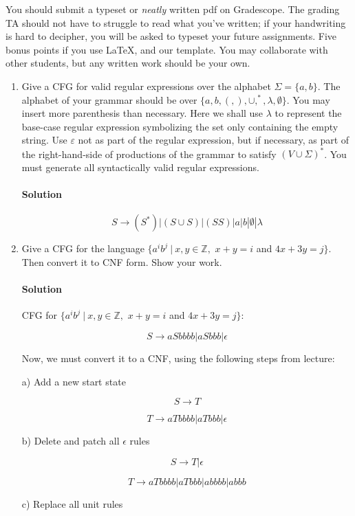 \documentclass[11pt]{article}
\newcommand{\solution}[1]{\paragraph{Solution}  }
\begin{document}

You should submit a typeset or \emph{neatly} written pdf on Gradescope.  The grading TA should not have to struggle to read what you've written; if your handwriting is hard to decipher, you will be asked to typeset your future assignments. Five bonus points if you use \LaTeX, and our template. You may collaborate with other students, but any written work should be your own.

\begin{enumerate}

    \item Give a CFG for valid regular expressions over the alphabet $\Sigma = \{a,b\}$. The alphabet of your grammar should be over $\{a,b,(,), \cup, ^*, \lambda, \emptyset\}$. You may insert more parenthesis than necessary. Here we shall use $\lambda$ to represent the base-case regular expression symbolizing the set only containing the empty string. Use $\varepsilon$ not as part of the regular expression, but if necessary, as part of the right-hand-side of productions of the grammar to satisfy $(V \cup \Sigma)^*$. You must generate all syntactically valid regular expressions.

    \solution{1} 

    $$ S \rightarrow (S^*) | (S \cup S) | (SS) | a | b | \emptyset | \lambda $$
    
    \item Give a CFG for the language $\{a^ib^j~|~x,y \in \mathbb{Z}, $ $x+y = i$ and $4x+3y = j\}$. Then convert it to CNF form. Show your work.

    \solution{2} CFG for $\{a^ib^j~|~x,y \in \mathbb{Z}, $ $x+y = i$ and $4x+3y = j\}$:

    $$ S \rightarrow aSbbbb | aSbbb | \epsilon $$

    Now, we must convert it to a CNF, using the following steps from lecture:

    a) Add a new start state

    $$ S \rightarrow T $$

    $$ T \rightarrow aTbbbb | aTbbb | \epsilon $$

    b) Delete and patch all $\epsilon$ rules

    $$ S \rightarrow T | \epsilon $$

    $$ T \rightarrow aTbbbb | aTbbb | abbbb | abbb $$

    c) Replace all unit rules


\end{enumerate}
\end{document}
